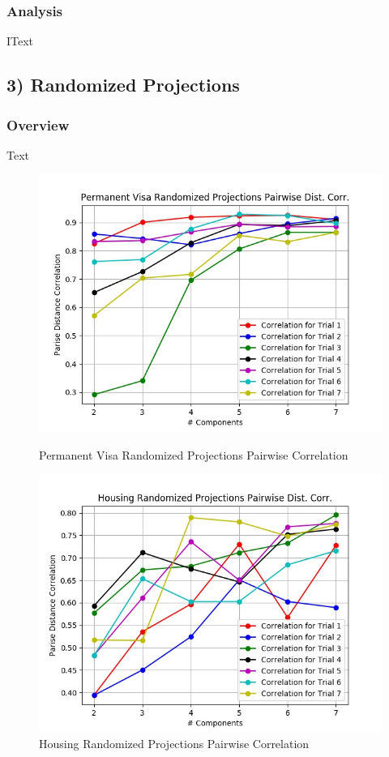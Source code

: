 \documentclass[h]{article}
\begin{document}
\subsubsection*{Analysis}
IText

\subsection*{3) Randomized Projections}  
\subsubsection*{Overview}
Text

 \begin{figure}[H]
      \includegraphics[width=1\textwidth,keepaspectratio]{permanent_visa_randomized_projections_pairwise_distpt_corrpt.jpg} 
      \caption*{Permanent Visa Randomized Projections Pairwise Correlation } 
   \endminipage\hfill
      \includegraphics[width=1\textwidth,keepaspectratio]{housing_randomized_projections_pairwise_distpt_corrpt.jpg} 
      \caption*{Housing Randomized Projections Pairwise Correlation} 
   \endminipage\hfill
\end{figure}
\end{document}
